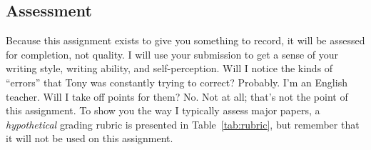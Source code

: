 \documentclass[10pt, oneside]{amsart}	%
\begin{document}
\begin{multicols}{2}
	\section{Assessment} %
	\label{sec:assessment}
	Because this assignment exists to give you something to record, it will be assessed for completion, not quality. I will use your submission to get a sense of your writing style, writing ability, and self-perception. Will I notice the kinds of ``errors'' that Tony was constantly trying to correct? Probably. I'm an English teacher. Will I take off points for them? No. Not at all; that's not the point of this assignment. To show you the way I typically assess major papers, a \emph{hypothetical} grading rubric is presented in Table~\ref{tab:rubric}, but remember that it will not be used on this assignment.

\begin{comment}
	\section{Formatting} %
	\label{sec:formatting}
	Because this is not a formal paper for this course, the formatting expectations are very lax. I request that the body text be in a double-spaced, 12-point typeface with serifs. Times New Roman works fine. One-inch margins on all sides will start a habit that will help when \textsc{mla} formatting becomes a requirement. A boring template (in Word format) is available on Webcourses, if you don't want to worry about formatting at all (because—let's face it—the content is what matters).
\end{comment}

\end{multicols}
\end{document}
